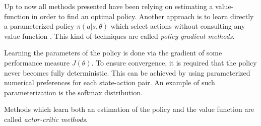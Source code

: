 Up to now all methods presented have been relying on estimating a value-function in order to find an optimal policy. Another approach is to learn directly a parameterized policy $\pi(a|s, \theta)$ which select actions without consulting any value function \cite[p.~323]{sutton_reinforcement_1998}. This kind of techniques are called \textit{policy gradient methods}. 

Learning the parameters of the policy is done via the gradient of some performance measure $J(\theta)$. To ensure convergence, it is required that the policy never becomes fully deterministic. This can be achieved by using parameterized numerical preferences for each state-action pair. An example of such parameterization is the softmax distribution. 

Methods which learn both an estimation of the policy and the value function are called \textit{actor-critic methods}.

 
 
 
 
 
